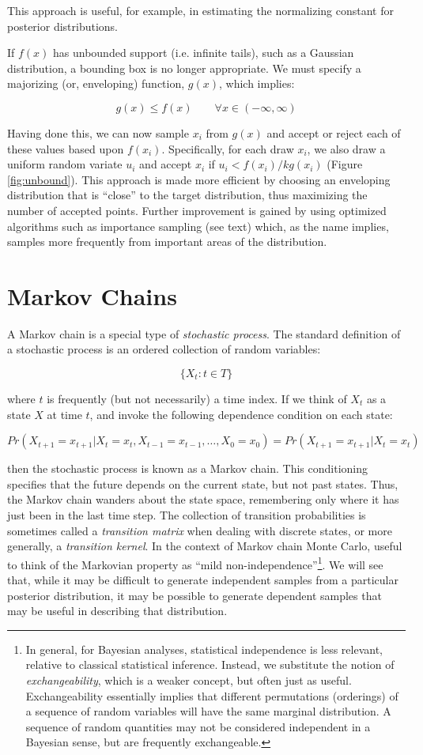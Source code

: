 \documentclass[]{book}
\begin{document}
\noindent This approach is useful, for example, in estimating the normalizing constant for posterior distributions.

If $f(x)$ has unbounded support (i.e. infinite tails), such as a Gaussian distribution, a bounding box is no longer appropriate. We must specify a majorizing (or, enveloping) function, $g(x)$, which implies:

\[
g(x) \le  f(x) \qquad\forall x \in (-\infty,\infty)
\]

Having done this, we can now sample ${x_i}$ from $g(x)$ and accept or reject each of these values based upon $f(x_i)$. Specifically, for each draw $x_i$, we also draw a uniform random variate $u_i$ and accept $x_i$ if $u_i < f(x_i)/kg(x_i)$ (Figure \ref{fig:unbound}). This approach is made more efficient by choosing an enveloping distribution that is ``close'' to the target distribution, thus maximizing the number of accepted points. Further improvement is gained by using optimized algorithms such as importance sampling (see text) which, as the name implies, samples more frequently from important areas of the distribution.

\section{Markov Chains}

A Markov chain is a special type of \emph{stochastic process}. The standard definition of a stochastic process is an ordered collection of random variables:

\[
\{X_t:t \in T\}
\]

\noindent where $t$ is frequently (but not necessarily) a time index. If we think of $X_t$ as a state $X$ at time $t$, and invoke the following dependence condition on each state:

\[
Pr(X_{t+1}=x_{t+1} | X_t=x_t, X_{t-1}=x_{t-1},\ldots,X_0=x_0) = Pr(X_{t+1}=x_{t+1} | X_t=x_t)
\]

\noindent then the stochastic process is known as a Markov chain. This conditioning specifies that the future depends on the current state, but not past states. Thus, the Markov chain wanders about the state space, remembering only where it has just been in the last time step. The collection of transition probabilities is sometimes called a \emph{transition matrix} when dealing with discrete states, or more generally, a \emph{transition kernel}. In the context of Markov chain Monte Carlo, useful to think of the Markovian property as ``mild non-independence''\footnote{In general, for Bayesian analyses, statistical independence is less relevant, relative to classical statistical inference. Instead, we substitute the notion of \emph{exchangeability}, which is a weaker concept, but often just as useful. Exchangeability essentially implies that different permutations (orderings) of a sequence of random variables will have the same marginal distribution. A sequence of random quantities may not be considered independent in a Bayesian sense, but are frequently exchangeable.}. We will see that, while it may be difficult to generate independent samples from a particular posterior distribution, it may be possible to generate dependent samples that may be useful in describing that distribution.
\end{document}
